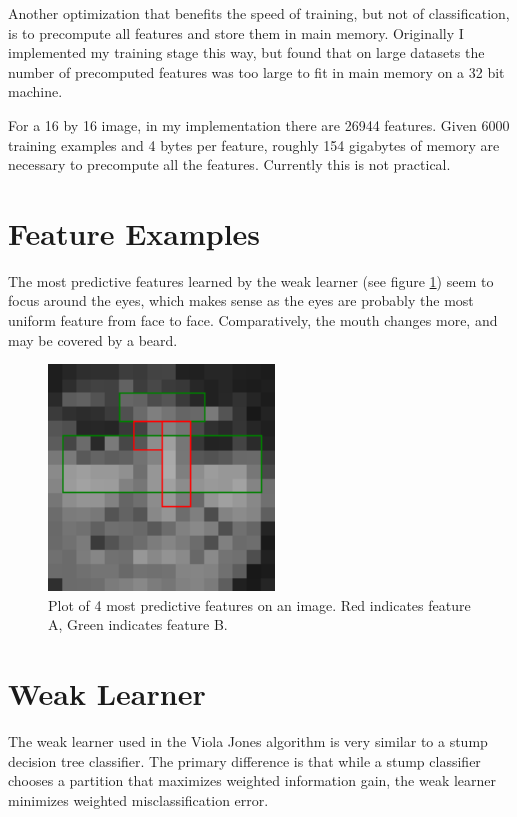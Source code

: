 \documentclass[11pt,twocolumn]{article}
\begin{document}
Another optimization that benefits the speed of training, but not of
classification, is to precompute all features and store them in main
memory. Originally I implemented my training stage this way, but found
that on large datasets the number of precomputed features was too
large to fit in main memory on a 32 bit machine.

For a 16 by 16 image, in my implementation there are 26944
features. Given 6000 training examples and 4 bytes per feature,
roughly 154 gigabytes of memory are necessary to precompute all the
features. Currently this is not practical.

\section{Feature Examples}

The most predictive features learned by the weak learner (see figure
\ref{fig:featureplot}) seem to focus around the eyes, which makes
sense as the eyes are probably the most uniform feature from face to
face. Comparatively, the mouth changes more, and may be covered by a
beard.

\begin{figure}
\includegraphics[width=60mm]{examples/features_plot.png}
\caption{Plot of 4 most predictive features on an image. Red indicates
  feature A, Green indicates feature B.}
\label{fig:featureplot}
\end{figure}

\section{Weak Learner}
\label{sec:weaklearner}

The weak learner used in the Viola Jones algorithm is very similar to
a stump decision tree classifier. The primary difference is that while
a stump classifier chooses a partition that maximizes weighted
information gain, the weak learner minimizes weighted
misclassification error.
\end{document}
